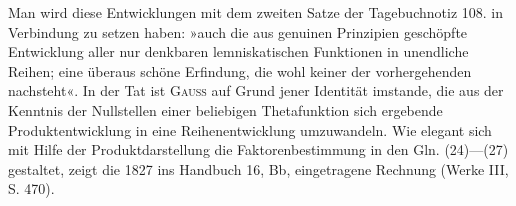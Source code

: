 Man wird diese Entwicklungen mit dem zweiten Satze der Tagebuchnotiz 108. in Verbindung zu setzen haben: »auch die aus genuinen Prinzipien
geschöpfte Entwicklung aller nur denkbaren lemniskatischen Funktionen in
unendliche Reihen; eine überaus schöne Erfindung, die wohl keiner der vorhergehenden nachsteht«. In der Tat ist \textsc{Gauss} auf Grund jener Identität imstande, die aus der Kenntnis der Nullstellen einer beliebigen Thetafunktion
sich ergebende Produktentwicklung in eine Reihenentwicklung umzuwandeln.
Wie elegant sich mit Hilfe der Produktdarstellung die Faktorenbestimmung
in den Gln. (24)—(27) gestaltet, zeigt die 1827 ins Handbuch 16, Bb, eingetragene Rechnung (Werke III, S. 470).
